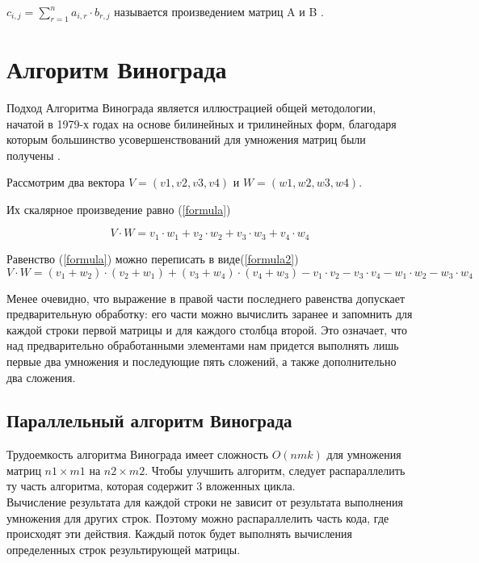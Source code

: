 \documentclass[12pt]{report}
\begin{document}
$c_{i,j} = \sum\limits_{r=1}^n a_{i,r}\cdot b_{r,j}$ называется произведением матриц A и B \cite{Beloysov}.


\section{Алгоритм Винограда}
Подход Алгоритма Винограда является иллюстрацией общей методологии, начатой в 1979-х годах на основе
билинейных и трилинейных форм, благодаря которым большинство усовершенствований для умножения матриц были получены \cite{Gall2012}.

Рассмотрим два вектора $V = (v1, v2, v3, v4)$ и $W = (w1, w2, w3, w4)$.  

 Их скалярное произведение равно (\ref{formula}) 

\begin{equation} \label{formula}
V \cdot W=v_1 \cdot w_1 + v_2 \cdot w_2 + v_3 \cdot w_3 + v_4 \cdot w_4
\end{equation}

Равенство (\ref{formula}) можно переписать в виде(\ref{formula2}) 
\begin{equation} \label{formula2}
V \cdot W=(v_1 + w_2) \cdot (v_2 + w_1) + (v_3 + w_4) \cdot (v_4 + w_3) - v_1 \cdot v_2 - v_3 \cdot v_4 - w_1 \cdot w_2 - w_3 \cdot w_4
\end{equation}

Менее очевидно, что выражение в правой части последнего равенства допускает предварительную обработку: его части можно вычислить заранее и запомнить для каждой строки первой матрицы и для каждого столбца второй. 
Это означает, что над предварительно обработанными элементами нам придется выполнять лишь первые два умножения и последующие пять сложений, а также дополнительно два сложения. 

\subsection{Параллельный алгоритм Винограда}
Трудоемкость алгоритма Винограда имеет сложность $O(nmk)$ для умножения матриц $n1 \times m1$ на $n2 \times m2$. Чтобы улучшить алгоритм, следует распараллелить ту часть алгоритма, которая содержит 3 вложенных цикла.\\

Вычисление результата для каждой строки не зависит от результата выполнения умножения для других строк. Поэтому можно распараллелить часть кода, где происходят эти действия. Каждый поток будет выполнять вычисления определенных строк результирующей матрицы.
	
\end{document}
